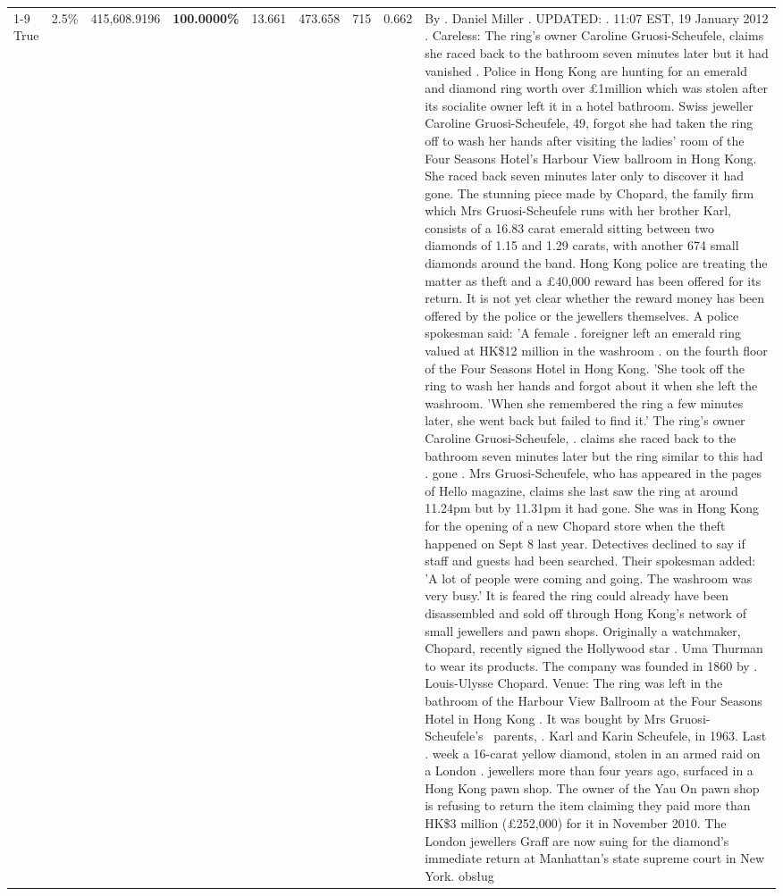 \begin{table}[H]
\begin{tabular}{lllrlllll}
 \\
\cline{1-9}
True & 2.5\% & 415,608.9196 & \bfseries \color{red} 100.0000\% & 13.661 & 473.658 & 715 & 0.662 & By . Daniel Miller . UPDATED: . 11:07 EST, 19 January 2012 . Careless: The ring's owner Caroline Gruosi-Scheufele, claims she raced back to the bathroom seven minutes later but it had vanished . Police in Hong Kong are hunting for an emerald and diamond ring worth over £1million which was stolen after its socialite owner left it in a hotel bathroom. Swiss jeweller Caroline Gruosi-Scheufele, 49, forgot she had taken the ring off to wash her hands after visiting the ladies' room of the Four Seasons Hotel's Harbour View ballroom in Hong Kong. She raced back seven minutes later only to discover it had gone. The stunning piece made by Chopard, the family firm which Mrs Gruosi-Scheufele runs with her brother Karl, consists of a 16.83 carat emerald sitting between two diamonds of 1.15 and 1.29 carats, with another 674 small diamonds around the band. Hong Kong police are treating the matter as theft and a £40,000 reward has been offered for its return. It is not yet clear whether the reward money has been offered by the police or the jewellers themselves. A police spokesman said: 'A female . foreigner left an emerald ring valued at HK\$12 million in the washroom . on the fourth floor of the Four Seasons Hotel in Hong Kong. 'She took off the ring to wash her hands and forgot about it when she left the washroom. 'When she remembered the ring a few minutes later, she went back but failed to find it.' The ring's owner Caroline Gruosi-Scheufele, . claims she raced back to the bathroom seven minutes later but the ring similar to this had . gone . Mrs Gruosi-Scheufele, who has appeared in the pages of Hello magazine, claims she last saw the ring at around 11.24pm but by 11.31pm it had gone. She was in Hong Kong for the opening of a new Chopard store when the theft happened on Sept 8 last year. Detectives declined to say if staff and guests had been searched. Their spokesman added: 'A lot of people were coming and going. The washroom was very busy.' It is feared the ring could already have been disassembled and sold off through Hong Kong's network of small jewellers and pawn shops. Originally a watchmaker, Chopard, recently signed the Hollywood star . Uma Thurman to wear its products. The company was founded in 1860 by . Louis-Ulysse Chopard. Venue: The ring was left in the bathroom of the Harbour View Ballroom at the Four Seasons Hotel in Hong Kong . It was bought by Mrs Gruosi-Scheufele's  parents, . Karl and Karin Scheufele, in 1963. Last . week a 16-carat yellow diamond, stolen in an armed raid on a London . jewellers more than four years ago, surfaced in a Hong Kong pawn shop. The owner of the Yau On pawn shop is refusing to return the item claiming they paid more than HK\$3 million (£252,000) for it in November 2010. The London jewellers Graff are now suing for the diamond’s immediate return at Manhattan’s state supreme court in New York. obsług \\

\end{tabular}
\end{table}
